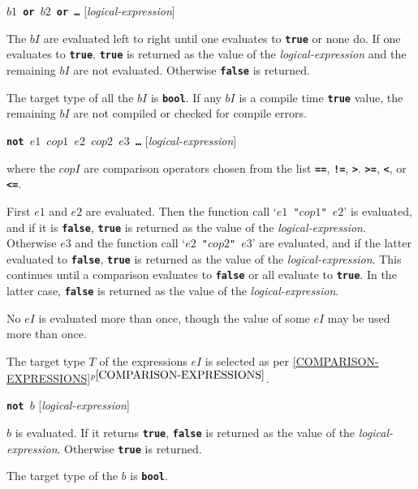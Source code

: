 \documentclass[12pt]{article}
\newcommand{\TT}[1]{{\tt \bfseries #1}}
\newcommand{\itemref}[1]{\ref{#1}$^{p\pageref{#1}}$}
\newenvironment{indpar}[1][0.3in]%
	{\begin{list}{}%
		     {\setlength{\itemsep}{0in}%
		      \setlength{\topsep}{0in}%
		      \setlength{\parsep}{1ex}%
		      \setlength{\labelwidth}{#1}%
		      \setlength{\leftmargin}{#1}%
		      \addtolength{\leftmargin}{\labelsep}}%
	 \item}%
	{\end{list}}
\begin{document}
\TT{$b1$ or $b2$ or \ldots{}}
\hfill [{\em logical-expression}]
\begin{indpar}
The $bI$ are evaluated left to right until one evaluates to
\TT{true} or none do.  If one evaluates to \TT{true},
\TT{true} is returned as the value of the {\em logical-expression}
and the remaining $bI$ are not evaluated.
Otherwise \TT{false} is returned.

The target type of all the $bI$ is \TT{bool}.  If any $bI$ is a
compile time \TT{true} value, the remaining $bI$ are not compiled
or checked for compile errors.
\end{indpar}

\TT{not $e1$ $cop1$ $e2$ $cop2$ $e3$ \ldots{}}
\hfill [{\em logical-expression}]
\begin{indpar}
where the $copI$ are comparison operators chosen from the list
\TT{==}, \TT{!=}, \TT{>}. \TT{>=}, \TT{<}, or \TT{<=}.

First $e1$ and $e2$ are evaluated.  Then the function
call `{\tt $e1$ "$cop1$" $e2$}'
is evaluated, and if it is \TT{false},
\TT{true} is returned as the value of the {\em logical-expression}.
Otherwise $e3$ and the function call `{\tt $e2$ "$cop2$" $e3$}'
are evaluated, and if the latter
evaluated to \TT{false},
\TT{true} is returned as the value of the {\em logical-expression}.
This continues until a comparison evaluates to \TT{false} or all
evaluate to \TT{true}.  In the latter case, \TT{false} is returned as
the value of the {\em logical-expression}.

No $eI$ is evaluated more than once, though the value of some $eI$
may be used more than once.

The target type $T$ of the expressions $eI$ is selected as
per \itemref{COMPARISON-EXPRESSIONS}.
\end{indpar}

\TT{not $b$}
\hfill [{\em logical-expression}]
\begin{indpar}
$b$ is evaluated.  If it returns \TT{true}, \TT{false} is
returned as the value of the {\em logical-expression}.
Otherwise \TT{true} is returned.

The target type of the $b$ is \TT{bool}.
\end{indpar}
\end{document}

